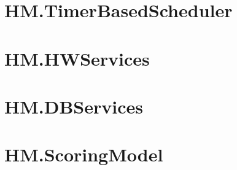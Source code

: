 \section{HM.TimerBasedScheduler}





\section{HM.HWServices}
\section{HM.DBServices}
\section{HM.ScoringModel}